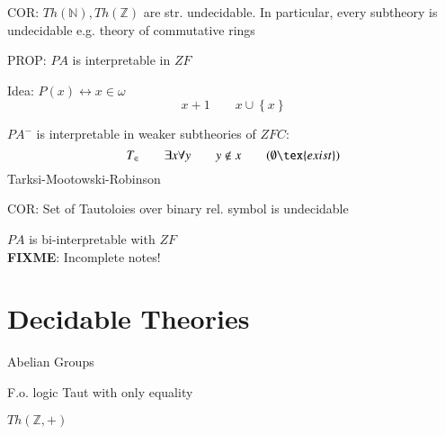\documentclass[12pt]{article}
\newcommand{\Nat}{\ensuremath{\mathbb{N}}}
\newcommand{\Integer}{\ensuremath{\mathbb{Z}}}
\newcommand{\fixme}{\\ \textbf{FIXME}: Incomplete notes!}
\begin{document}
COR: $Th(\Nat), Th(\Integer)$ are str. undecidable.
In particular, every subtheory is undecidable
e.g. theory of commutative rings

PROP: $PA$ is interpretable in $ZF$

Idea: $P(x) \leftrightarrow x \in \omega$
\[
x+1 \qquad x \cup \left\{ x \right\}
\]

$PA^-$ is interpretable in weaker subtheories of $ZFC$:
\[
T_\in 
\qquad
\exists x \forall y
\qquad
y \not\in x
\qquad
(\emptyset \tex{ exist})
\]
Tarksi-Mootowski-Robinson

COR: Set of Tautoloies over binary rel. symbol is undecidable

$PA$ is bi-interpretable with $ZF$\fixme

\section*{Decidable Theories}

Abelian Groups

F.o. logic Taut with only equality

$Th(\Integer, +)$
\end{document}
